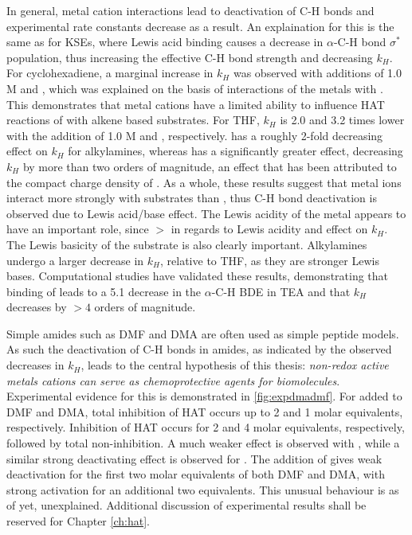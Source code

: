 In general, metal cation interactions lead to deactivation of C-H bonds and
experimental rate constants decrease as a result. An explaination for this is
the same as for KSEs, where Lewis acid binding causes a decrease in $\alpha$-C-H
bond $\sigma^*$ population, thus increasing the effective C-H bond strength and
decreasing $k_H$. For cyclohexadiene, a marginal increase in $k_H$ was observed
with additions of 1.0 M  and , which was explained on
the basis of interactions of the metals with \cumo. This demonstrates that metal
cations have a limited ability to influence HAT reactions of \cumo with alkene
based substrates. For THF, $k_H$ is 2.0 and 3.2 times lower with the addition of
1.0 M  and , respectively.  has a roughly
2-fold decreasing effect on $k_H$ for alkylamines, whereas  has a
significantly greater effect, decreasing $k_H$ by more than two orders of
magnitude, an effect that has been attributed to the compact charge density of
. As a whole, these results suggest that metal ions interact more
strongly with substrates than \cumo, thus C-H bond deactivation is observed due
to Lewis acid/base effect. The Lewis acidity of the metal appears to have an
important role, since  $>$  in regards to Lewis acidity
and effect on $k_H$. The Lewis basicity of the substrate is also clearly
important. Alkylamines undergo a larger decrease in $k_H$, relative to THF, as
they are stronger Lewis bases. Computational studies have validated these
results, demonstrating that binding of  leads to a 5.1 \kcalmol
decrease in the $\alpha$-C-H BDE in TEA and that $k_H$ decreases by
$>4$ orders of magnitude.\cite{Nova2014}

Simple amides such as DMF and DMA are often used as simple peptide
models.\cite{Salamone2015a} As such the deactivation of C-H bonds in amides, as
indicated by the observed decreases in $k_H$, leads to the central hypothesis of
this thesis: \emph{non-redox active metals cations can serve as chemoprotective
  agents for biomolecules}. Experimental evidence for this is demonstrated in
\ref{fig:expdmadmf}. For  added to DMF and DMA, total inhibition of
HAT occurs up to 2 and 1 molar equivalents, respectively. Inhibition of HAT
occurs for 2 and 4 molar equivalents, respectively, followed by total
non-inhibition. A much weaker effect is observed with , while a
similar strong deactivating effect is observed for . The addition
of  gives weak deactivation for the first two molar equivalents of
both DMF and DMA, with strong activation for an additional two equivalents. This
unusual behaviour is as of yet, unexplained. Additional discussion of
experimental results shall be reserved for Chapter \ref{ch:hat}.

